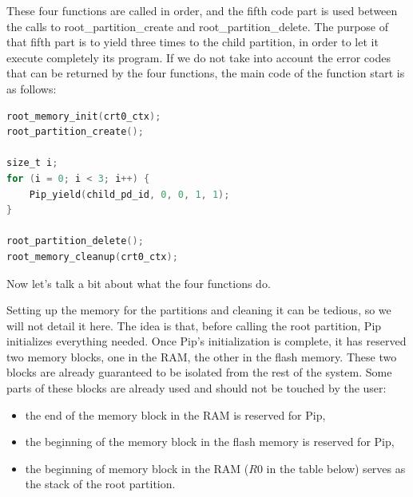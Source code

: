 \documentclass[10pt,a4paper,titlepage]{refart}
\begin{document}
These four functions are called in order, and the fifth code part is used between the calls to root\_partition\_create and 
root\_partition\_delete. The purpose of that fifth part is to yield three times to the child partition, in order to let it execute 
completely its program. If we do not take into account the error codes that can be returned by the four functions, the main code of 
the function start is as follows:

\begin{lstlisting}[language=C]
root_memory_init(crt0_ctx);
root_partition_create();

size_t i;
for (i = 0; i < 3; i++) {
    Pip_yield(child_pd_id, 0, 0, 1, 1);
}

root_partition_delete();
root_memory_cleanup(crt0_ctx);
\end{lstlisting}

Now let's talk a bit about what the four functions do.


Setting up the memory for the partitions and cleaning it can be tedious, so we will not detail it here. The idea is that, before 
calling the root partition, Pip initializes everything needed. Once Pip's initialization is complete, it has reserved two memory 
blocks, one in the RAM, the other in the flash memory. These two blocks are already guaranteed to be isolated from the rest of the 
system. Some parts of these blocks are already used and should not be touched by the user:
\begin{itemize}
    \item the end of the memory block in the RAM is reserved for Pip,
    \item the beginning of the memory block in the flash memory is reserved for Pip,
    \item the beginning of memory block in the RAM ($R0$ in the table below) serves as the stack of the root partition.
\end{itemize}
\end{document}
